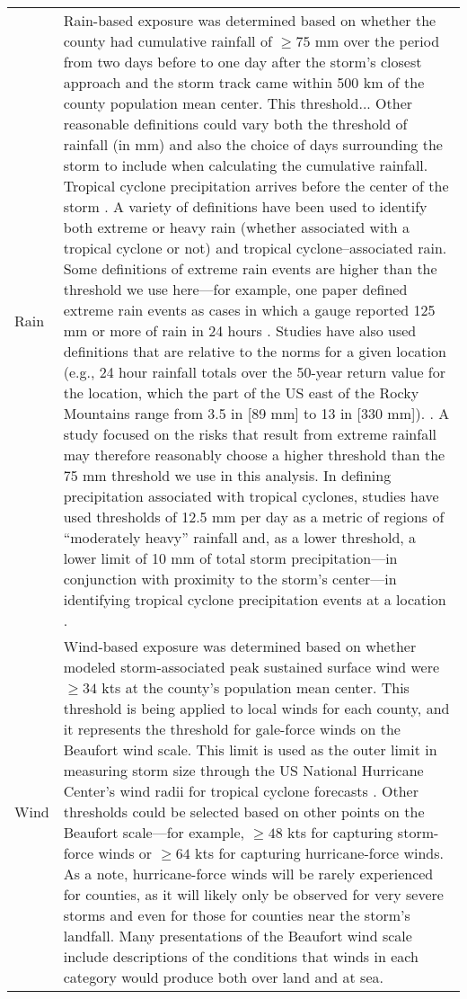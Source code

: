 \begin{longtable}{lp{40em}}
Rain & Rain-based exposure was determined based on whether the county had cumulative rainfall of $\ge75$ mm over the period from two days before to one day after the storm’s closest approach and the storm track came within 500 km of the county population mean center. This threshold... Other reasonable definitions could vary both the threshold of rainfall (in mm) and also the choice of days surrounding the storm to include when calculating the cumulative rainfall. Tropical cyclone precipitation arrives before the center of the storm \parencite{zhou2017spatial}. A variety of definitions have been used to identify both extreme or heavy rain (whether associated with a tropical cyclone or not) and tropical cyclone--associated rain. Some definitions of extreme rain events are higher than the threshold we use here---for example, one paper defined extreme rain events as cases in which a gauge reported 125 mm or more of rain in 24 hours \parencite{schumacher2006characteristics}. Studies have also used definitions that are relative to the norms for a given location (e.g., 24 hour rainfall totals over the 50-year return value for the location, which the part of the US east of the Rocky Mountains range from 3.5 in [89 mm] to 13 in [330 mm]). \parencite{schumacher2006characteristics, schumacher2005organization, stevenson201410}. A study focused on the risks that result from extreme rainfall may therefore reasonably choose a higher threshold than the 75 mm threshold we use in this analysis. In defining precipitation associated with tropical cyclones, studies have used thresholds of 12.5 mm per day as a metric of regions of ``moderately heavy'' rainfall \parencite{zhou2017spatial} and, as a lower threshold, a lower limit of 10 mm of total storm precipitation---in conjunction with proximity to the storm's center---in identifying tropical cyclone precipitation events at a location \parencite{feldmann2019estimation}. \\
Wind & Wind-based exposure was determined based on whether modeled storm-associated peak sustained surface wind were $\ge34$ kts at the county’s population mean center. This threshold is being applied to local winds for each county, and it represents the threshold for gale-force winds on the Beaufort wind scale. This limit is used as the outer limit in measuring storm size through the US National Hurricane Center's wind radii for tropical cyclone forecasts \parencite{cangialosi2016examination}. Other thresholds could be selected based on other points on the Beaufort scale---for example, $\ge48$ kts for capturing storm-force winds or $\ge64$ kts for capturing hurricane-force winds. As a note, hurricane-force winds will be rarely experienced for counties, as it will likely only be observed for very severe storms and even for those for counties near the storm's landfall. Many presentations of the Beaufort wind scale include descriptions of the conditions that winds in each category would produce both over land and at sea.\\
\hline
\end{longtable}